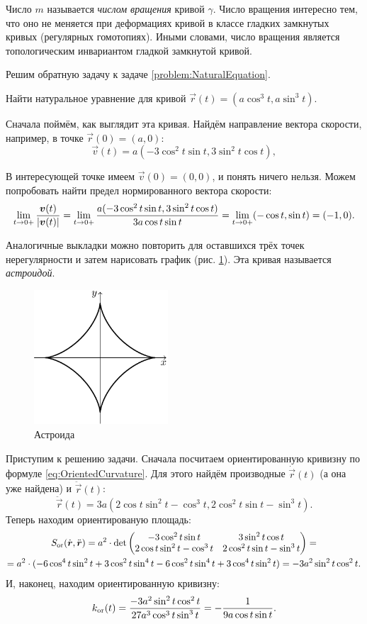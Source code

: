 Число $m$ называется \textit{числом вращения} кривой $\gamma$. Число вращения интересно тем, что оно не меняется при деформациях кривой в классе гладких замкнутых кривых (регулярных гомотопиях). Иными словами, число вращения является топологическим инвариантом гладкой замкнутой кривой.

Решим обратную задачу к задаче \ref{problem:NaturalEquation}.

\begin{problem}
	Найти натуральное уравнение для кривой $\vec{r}(t) = (a\cos^3t, a\sin^3t)$.
\end{problem}

\begin{solution}
	Сначала поймём, как выглядит эта кривая. Найдём направление вектора скорости, например, в точке $\vec{r}(0) = (a, 0)$:
	\[
		\vec{v}(t) = a(-3\cos^2t\sin t, 3\sin^2t\cos t),
	\]

	В интересующей точке имеем $\vec{v}(0) = (0, 0)$, и понять ничего нельзя. Можем попробовать найти предел нормированного вектора скорости:
	\[
		\lim_{t \to 0+}\frac{\boldsymbol{v}(t)}{\left\lvert\boldsymbol{v}(t)\right\rvert} = \lim_{t \to 0+}\frac{a(-3\cos^2t\sin t, 3\sin^2t\cos t)}{3a\cos t\sin t} = \lim_{t \to 0+}(-\cos t, \sin t) = (-1, 0).
	\]

	Аналогичные выкладки можно повторить для оставшихся трёх точек нерегулярности и затем нарисовать график (рис. \ref{fig:Astroid}). Эта кривая называется \textit{астроидой}.

	\begin{figure}[h]
		\centering
		\includegraphics[width=5cm]{./img/Astroid.pdf}
		\caption{Астроида}
		\label{fig:Astroid}
	\end{figure}

	Приступим к решению задачи. Сначала посчитаем ориентированную кривизну по формуле \eqref{eq:OrientedCurvature}. Для этого найдём производные $\dot{\vec{r}}(t)$ (а она уже найдена) и $\ddot{\vec{r}}(t)$:
	\[
		\ddot{\vec{r}}(t) = 3a(2\cos t\sin^2t - \cos^3t, 2\cos^2t\sin t - \sin^3t).
	\]
	Теперь находим ориентированую площадь:
	\begin{multline*}
		S_{\mathrm{or}}(\dot{\boldsymbol{r}}, \ddot{\boldsymbol{r}}) = a^2 \cdot \det
		\begin{pmatrix}
			-3\cos^2t\sin t & 3\sin^2t\cos t\\
			2\cos t\sin^2 t - \cos^3t & 2\cos^2t\sin t - \sin^3t
		\end{pmatrix} = \\ = a^2 \cdot (-6\cos^4t\sin^2t + 3\cos^2t\sin^4t - 6\cos^2t\sin^4t + 3\cos^4t\sin^2t) = -3a^2\sin^2t\cos^2t.
	\end{multline*}
	И, наконец, находим ориентированную кривизну:
	\[
		k_{\mathrm{or}}(t) = \frac{-3a^2\sin^2t\cos^2t}{27a^3\cos^3t\sin^3t} = -\frac{1}{9a\cos t\sin t}.
	\]


\end{solution}
